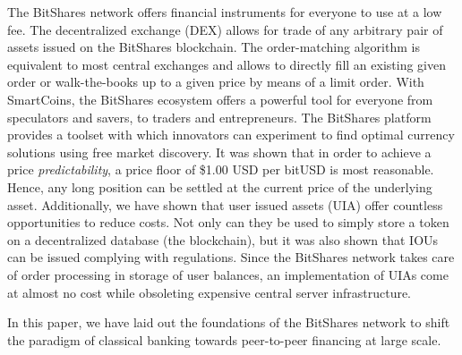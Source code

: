 The BitShares network offers financial instruments for everyone to use at a low
fee.
%
The decentralized exchange (DEX) allows for trade of any arbitrary pair of
assets issued on the BitShares blockchain. The order-matching algorithm is
equivalent to most central exchanges and allows to directly fill an existing
given order or walk-the-books up to a given price by means of a limit order.
%
With SmartCoins, the BitShares ecosystem offers a powerful tool for everyone
from speculators and savers, to traders and entrepreneurs. The BitShares
platform provides a toolset with which innovators can experiment to find
optimal currency solutions using free market discovery. It was shown that in
order to achieve a price \emph{predictability}, a price floor of \$1.00 USD per
bitUSD is most reasonable. Hence, any long position can be settled at the
current price of the underlying asset.
%
Additionally, we have shown that user issued assets (UIA) offer countless
opportunities to reduce costs. Not only can they be used to simply store a
token on a decentralized database (the blockchain), but it was also shown that
IOUs can be issued complying with regulations. Since the BitShares network
takes care of order processing in storage of user balances, an implementation
of UIAs come at almost no cost while obsoleting expensive central server
infrastructure. 
%
%

In this paper, we have laid out the foundations of the BitShares network to
shift the paradigm of classical banking towards peer-to-peer financing at large
scale.
